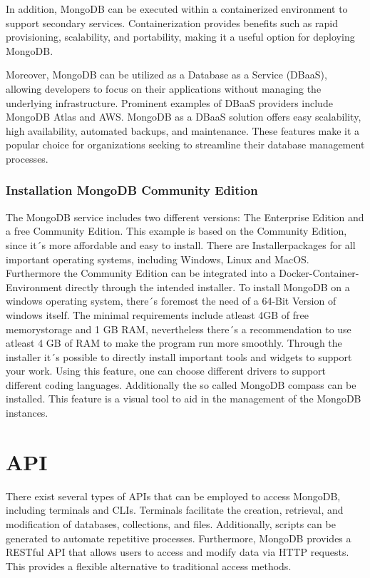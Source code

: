 In addition, MongoDB can be executed within a containerized environment to support secondary services. Containerization provides benefits such as rapid provisioning, scalability, and portability, making it a useful option for deploying MongoDB. \parencite{mujdrica_docker}

Moreover, MongoDB can be utilized as a Database as a Service (DBaaS), allowing developers to focus on their applications without managing the underlying infrastructure. Prominent examples of DBaaS providers include MongoDB Atlas and AWS. MongoDB as a DBaaS solution offers easy scalability, high availability, automated backups, and maintenance. These features make it a popular choice for organizations seeking to streamline their database management processes. \parencite{mujdrica_aws}

\subsubsection{Installation MongoDB Community Edition}

The MongoDB service includes two different versions: The Enterprise Edition and a free Community Edition. This example is based on the Community Edition, since it´s more affordable and easy to install. There are Installerpackages for all important operating systems, including Windows, Linux and MacOS. Furthermore the Community Edition can be integrated into a Docker-Container-Environment directly through the intended installer. To install MongoDB on a windows operating system, there´s foremost the need of a 64-Bit Version of windows itself. The minimal requirements include atleast 4GB of free memorystorage and 1 GB \ac{RAM}, nevertheless there´s a recommendation to use atleast 4 GB of \ac{RAM} to make the program run more smoothly. Through the installer it´s possible to directly install important tools and widgets to support your work. Using this feature, one can choose different drivers to support different coding languages. Additionally the so called MongoDB compass can be installed. This feature is a visual tool to aid in the management of the MongoDB instances. \parencite{mujdrica_community}

\section{API}

There exist several types of APIs that can be employed to access MongoDB, including terminals and \acp{CLI}. Terminals facilitate the creation, retrieval, and modification of databases, collections, and files. Additionally, scripts can be generated to automate repetitive processes. Furthermore, MongoDB provides a \ac{REST}ful \ac{API} that allows users to access and modify data via \ac{HTTP} requests. This provides a flexible alternative to traditional access methods.

